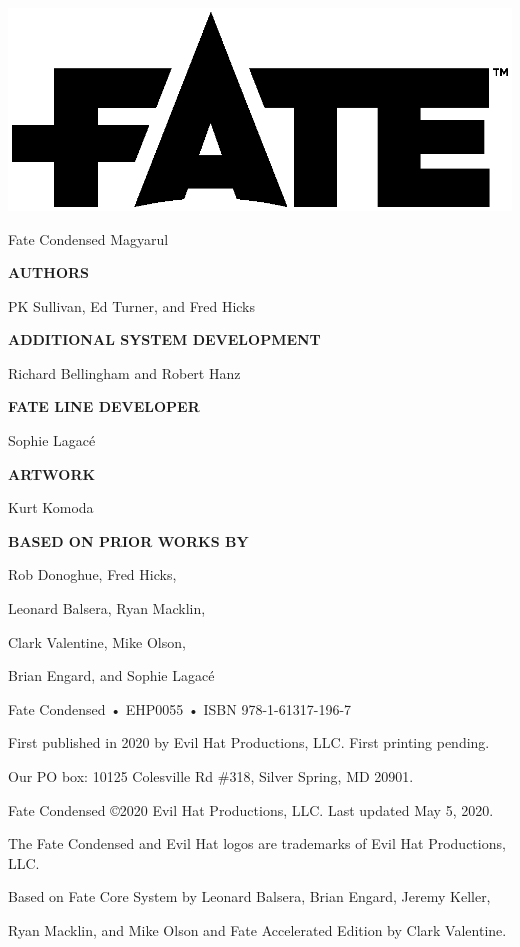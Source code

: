 \begin{center}

\includegraphics[trim= 0cm 4cm 0cm 2cm]{fate logo.eps}

{\RobotoCondensed\Huge\MakeUppercase Fate Condensed Magyarul}

\vspace{2em}

\textbf{AUTHORS}

PK Sullivan, Ed Turner, and Fred Hicks

\textbf{ADDITIONAL SYSTEM DEVELOPMENT}

Richard Bellingham and Robert Hanz

\textbf{FATE LINE DEVELOPER}

Sophie Lagacé

\textbf{ARTWORK}

Kurt Komoda

\textbf{BASED ON PRIOR WORKS BY}

Rob Donoghue, Fred Hicks,

Leonard Balsera, Ryan Macklin,

Clark Valentine, Mike Olson,

Brian Engard, and Sophie Lagacé

\vspace{2em}

Fate Condensed • EHP0055 • ISBN 978-1-61317-196-7

First published in 2020 by Evil Hat Productions, LLC. First printing pending.

Our PO box: 10125 Colesville Rd \#318, Silver Spring, MD 20901.

Fate Condensed ©2020 Evil Hat Productions, LLC. Last updated May 5, 2020.

The Fate Condensed and Evil Hat logos are trademarks of Evil Hat Productions, LLC.

Based on Fate Core System by Leonard Balsera, Brian Engard, Jeremy Keller,

Ryan Macklin, and Mike Olson and Fate Accelerated Edition by Clark Valentine.


\end{center}
